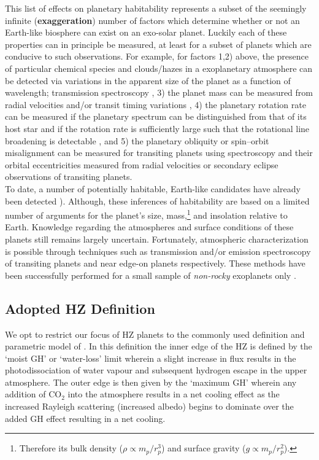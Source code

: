 This list of effects on planetary habitability represents a subset of the 
seemingly infinite (\textbf{exaggeration}) number of factors which determine 
whether or not an Earth-like biosphere can exist on an exo-solar planet. 
Luckily each of these properties can in principle be measured, at least for 
a subset of planets which are conducive to such observations. For example, 
for factors 1,2) above, 
the presence of particular chemical species and clouds/hazes 
in a exoplanetary atmosphere 
can be detected via variations in the apparent size of the planet as a function 
of wavelength; transmission spectroscopy \citep{seager00}, 3) the planet 
mass can be measured from radial velocities and/or transit timing variations 
\citep{holman05}, 4) the planetary rotation rate can be measured if the 
planetary spectrum can be distinguished from that of its host star and if the 
rotation rate is sufficiently large such that the rotational line broadening 
is detectable \citep[e.g.][]{snellen14, schwarz16}, and 5) the planetary obliquity or 
spin--orbit misalignment can be measured for transiting planets using 
spectroscopy \citep{rossiter24, mclaughlin24, queloz00} and their orbital 
eccentricities measured from radial velocities or secondary eclipse observations of 
transiting planets. \\

To date, a number of potentially habitable, Earth-like candidates have already 
been detected \citep[e.g. Kepler-438b, 442b;][]{torres15}). Although, these 
inferences of habitability are based on a limited number of arguments for the 
planet's size, mass,\footnote{Therefore its bulk density 
($\rho \propto m_p/r_p^3$) and surface gravity ($g \propto m_p/r_p^2$).} and 
insolation relative to Earth. Knowledge regarding the atmospheres and surface 
conditions of these planets still remains largely uncertain. Fortunately, 
atmospheric 
characterization is possible through techniques such as transmission and/or 
emission spectroscopy of transiting planets and near edge-on planets 
respectively. These methods have been successfully performed for a small 
sample of \emph{non-rocky} exoplanets only 
\citep[e.g.][]{bean13, crouzet14, kreidberg14, mccullough14}. 

\subsection{Adopted HZ Definition}
We opt to restrict our focus of HZ planets to the commonly used definition 
\citep{kasting93} and parametric model of \cite{kopparapu13}. 
In this definition the inner edge of the HZ 
is defined by the `moist GH' or `water-loss' limit wherein a slight increase 
in flux results in the 
photodissociation of water vapour and subsequent hydrogen escape in the upper 
atmosphere. The outer edge is then given by the `maximum GH' wherein any 
addition of CO$_2$ into the atmosphere results in a net cooling effect as the 
increased Rayleigh scattering (increased albedo) begins to dominate over the 
added GH effect resulting in a net cooling. \\

